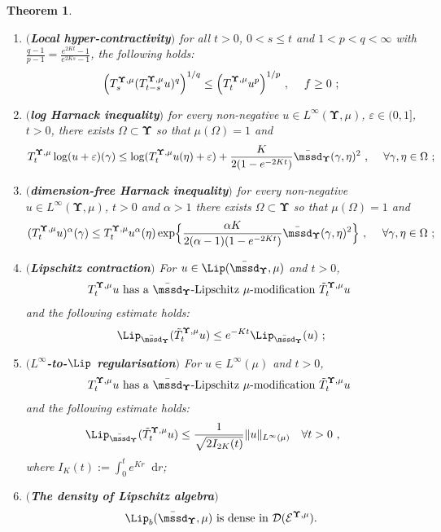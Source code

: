 \documentclass[11pt,letterpaper]{amsart}
\newcommand{\dom}[1]{\mathcal D(#1)}
\newcommand{\diff}{\mathop{}\!\mathrm{d}}
\newcommand{\comma}{\,\,\mathrm{,}\;\,}
\newcommand{\fstop}{\,\,\mathrm{.}}
\newcommand{\QP}{{\mu}}
\newcommand{\e}{\varepsilon}
\newcommand{\dUpsilon}{{\mathbf \Upsilon}}
\newcommand{\U}{\dUpsilon}
\newcommand{\E}{\mathcal E}
\renewcommand{\1}{\mathbf 1}
\numberwithin{equation}{section}
\theoremstyle{plain}
\newtheorem{thm}{Theorem}[section]
\theoremstyle{definition}
\theoremstyle{remark}
\begin{document}
\begin{thm}
\begin{enumerate}[$(a)$]
\item $(${\bf Local hyper-contractivity}$)$ for all $t>0$, $0<s\le t$ and $1<p<q<\infty$ with $\frac{q-1}{p-1}=\frac{e^{2Kt}-1}{e^{2Ks}-1}$, the following holds:
$$\Bigl( T_s^{\U, \QP}(T^{\U, \QP}_{t-s}u)^{q}\Bigr)^{1/q} \le \Bigl( T_t^{\U, \QP}u^p\Bigr)^{1/p} \comma\quad f \ge 0 \ ;$$
\item $(${\bf  log Harnack inequality}$)$ for every non-negative $u \in L^\infty(\U, \QP)$, $\e \in (0, 1]$, $t>0$, there exists $\Omega \subset \U$ so that $\QP(\Omega)=1$ and 
$$T^{\U, \QP}_t\log (u+\e)(\gamma) \le \log (T^{\U, \QP}_tu(\eta)+\e) + \frac{K}{2(1-e^{-2Kt})}\bar{\mssd}_\U(\gamma, \eta)^2\comma \quad \text{$\forall \gamma, \eta \in \Omega$} \ ;$$
\item $(${\bf  dimension-free Harnack inequality}$)$ for every non-negative $u \in L^\infty(\U, \QP)$, $t>0$ and $\alpha>1$ there exists $\Omega \subset \U$ so that $\QP(\Omega)=1$ and 
$$(T^{\U, \QP}_tu)^\alpha(\gamma)\le T^{\U, \QP}_tu^\alpha(\eta) \exp\Bigl\{ \frac{\alpha K}{2(\alpha-1)(1-e^{-2Kt})}\bar{\mssd}_\U(\gamma, \eta)^2\Bigr\} \comma \quad \text{$\forall \gamma, \eta \in \Omega$} \ ;$$
\item $(${\bf  Lipschitz contraction}$)$ For $u \in \Lip(\bar{\mssd}_\U, \QP)$ and $t>0$, 
\begin{align*}
\text{$T_t^{\U, \QP}u$ has a $\bar{\mssd}_\U$-Lipschitz $\QP$-modification~$\tilde{T}_t^{\U, \QP}u$ }
\end{align*}
and the following estimate holds:
$$\Lip_{\bar{\mssd}_\U}(\tilde{T}_t^{\U, \QP} u) \le e^{-Kt}\Lip_{\bar{\mssd}_\U}(u) \ ;$$
\item$(${\bf $L^\infty$-to-$\Lip$ regularisation}$)$ 
For $u \in L^\infty(\QP)$ and $t>0$, 
\begin{align*}
\text{$T_t^{\U, \QP}u$ has a $\bar{\mssd}_\U$-Lipschitz $\QP$-modification~$\tilde{T}_t^{\U, \QP}u$ }
\end{align*}
and the following estimate holds:
\begin{align*}%
\Lip_{\bar{\mssd}_\U}(\tilde{T}_t^{\U, \QP} u) &\le \frac{1}{\sqrt{2I_{2K}(t)} } \|u\|_{L^\infty(\QP)} \quad \forall t>0 \comma
\end{align*}
where $I_K(t):=\int_0^t e^{Kr} \diff r$;
\item$(${\bf The density of Lipschitz algebra}$)$ 
$$\text{$\Lip_b(\bar{\mssd}_\U, \QP)$ is dense in $\dom{\E^{\U, \QP}}$.}$$


\end{enumerate}
\end{thm}
\end{document}
